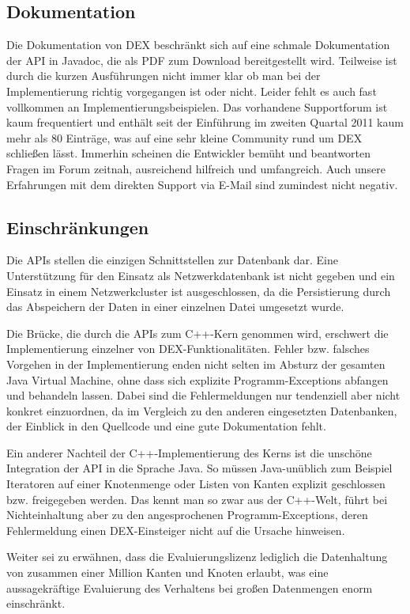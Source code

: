 \documentclass[11pt, a4paper, oneside]{article} %
\begin{document}
\subsection{Dokumentation}
Die Dokumentation von DEX beschränkt sich auf eine schmale Dokumentation der API in Javadoc, die als PDF zum Download bereitgestellt wird. Teilweise ist durch die kurzen Ausführungen nicht immer klar ob man bei der Implementierung richtig vorgegangen ist oder nicht. Leider fehlt es auch fast vollkommen an Implementierungsbeispielen. Das vorhandene Supportforum ist kaum frequentiert und enthält seit der Einführung im zweiten Quartal 2011 kaum mehr als 80 Einträge, was auf eine sehr kleine Community rund um DEX schließen lässt. Immerhin scheinen die Entwickler bemüht und beantworten Fragen im Forum zeitnah, ausreichend hilfreich und umfangreich. Auch unsere Erfahrungen mit dem direkten Support via E-Mail sind zumindest nicht negativ.

\subsection{Einschränkungen}
Die APIs stellen die einzigen Schnittstellen zur Datenbank dar. Eine Unterstützung für den Einsatz als Netzwerkdatenbank ist nicht gegeben und ein Einsatz in einem Netzwerkcluster ist ausgeschlossen, da die Persistierung durch das Abspeichern der Daten in einer einzelnen Datei umgesetzt wurde.

Die Brücke, die durch die APIs zum C++-Kern genommen wird, erschwert die Implementierung einzelner von DEX-Funktionalitäten. Fehler bzw. falsches Vorgehen in der Implementierung enden nicht selten im Absturz der gesamten Java Virtual Machine, ohne dass sich explizite Programm-Exceptions abfangen und behandeln lassen. Dabei sind die Fehlermeldungen nur tendenziell aber nicht konkret einzuordnen, da im Vergleich zu den anderen eingesetzten Datenbanken, der Einblick in den Quellcode und eine gute Dokumentation fehlt. 

Ein anderer Nachteil der C++-Implementierung des Kerns ist die unschöne Integration der API in die Sprache Java. So müssen Java-unüblich zum Beispiel Iteratoren auf einer Knotenmenge oder Listen von Kanten explizit geschlossen bzw. freigegeben werden. Das kennt man so zwar aus der C++-Welt, führt bei Nichteinhaltung aber zu den angesprochenen Programm-Exceptions, deren Fehlermeldung einen DEX-Einsteiger nicht auf die Ursache hinweisen.

Weiter sei zu erwähnen, dass die Evaluierungslizenz lediglich die Datenhaltung von zusammen einer Million Kanten und Knoten erlaubt, was eine aussagekräftige Evaluierung des Verhaltens bei großen Datenmengen enorm einschränkt.
\end{document}

